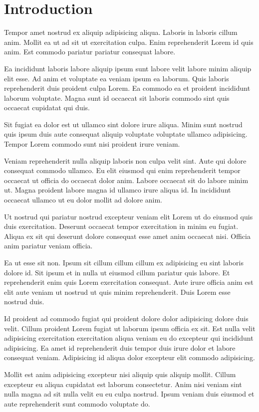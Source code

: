 \section{Introduction}
Tempor amet nostrud ex aliquip adipisicing aliqua. Laboris in laboris cillum anim. Mollit ea ut ad sit ut exercitation culpa. Enim reprehenderit Lorem id quis anim. Est commodo pariatur pariatur consequat labore.

Ea incididunt laboris labore aliquip ipsum sunt labore velit labore minim aliquip elit esse. Ad anim et voluptate ea veniam ipsum ea laborum. Quis laboris reprehenderit duis proident culpa Lorem. Ea commodo ea et proident incididunt laborum voluptate. Magna sunt id occaecat sit laboris commodo sint quis occaecat cupidatat qui duis.

Sit fugiat ea dolor est ut ullamco sint dolore irure aliqua. Minim sunt nostrud quis ipsum duis aute consequat aliquip voluptate voluptate ullamco adipisicing. Tempor Lorem commodo sunt nisi proident irure veniam.

Veniam reprehenderit nulla aliquip laboris non culpa velit sint. Aute qui dolore consequat commodo ullamco. Eu elit eiusmod qui enim reprehenderit tempor occaecat ut officia do occaecat dolor anim. Labore occaecat sit do labore minim ut. Magna proident labore magna id ullamco irure aliqua id. In incididunt occaecat ullamco ut eu dolor mollit ad dolore anim.

Ut nostrud qui pariatur nostrud excepteur veniam elit Lorem ut do eiusmod quis duis exercitation. Deserunt occaecat tempor exercitation in minim eu fugiat. Aliqua ex sit qui deserunt dolore consequat esse amet anim occaecat nisi. Officia anim pariatur veniam officia.

Ea ut esse sit non. Ipsum sit cillum cillum cillum ex adipisicing eu sint laboris dolore id. Sit ipsum et in nulla ut eiusmod cillum pariatur quis labore. Et reprehenderit enim quis Lorem exercitation consequat. Aute irure officia anim est elit aute veniam ut nostrud ut quis minim reprehenderit. Duis Lorem esse nostrud duis.

Id proident ad commodo fugiat qui proident dolore dolor adipisicing dolore duis velit. Cillum proident Lorem fugiat ut laborum ipsum officia ex sit. Est nulla velit adipisicing exercitation exercitation aliqua veniam eu do excepteur qui incididunt adipisicing. Ea amet id reprehenderit duis tempor duis irure dolor et labore consequat veniam. Adipisicing id aliqua dolor excepteur elit commodo adipisicing.

Mollit est anim adipisicing excepteur nisi aliquip quis aliquip mollit. Cillum excepteur eu aliqua cupidatat est laborum consectetur. Anim nisi veniam sint nulla magna ad sit nulla velit eu eu culpa nostrud. Ipsum veniam duis eiusmod et aute reprehenderit sunt commodo voluptate do.

